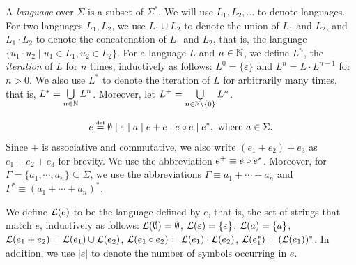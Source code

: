 A \emph{language} over $\Sigma$ is a subset of $\Sigma^*$. We will use $L_1, L_2, \dots$ to denote languages. For two languages $L_1, L_2$, we use $L_1 \cup L_2$ to denote the union of $L_1$ and $L_2$, and $L_1 \cdot L_2$ to denote the concatenation of $L_1$ and $L_2$, that is, the language $\{u_1 \cdot u_2 \mid u_1 \in L_1, u_2 \in L_2\}$. For a language $L$ and $n \in \mathbb{N}$, we define $L^n$, the \emph{iteration} of $L$ for $n$ times, inductively as follows: $L^0=\{\varepsilon\}$ and $L^{n} =L \cdot L^{n-1}$ for $n > 0$. We also use $L^*$ to denote the iteration of $L$ for arbitrarily many times, that is, $L^* = \bigcup \limits_{n \in \mathbb{N}} L^n$. Moreover, let $L^+ = \bigcup \limits_{n \in \mathbb{N} \setminus \{0\}} L^n$.

\begin{definition}
	\[e \eqdef \emptyset \mid \varepsilon \mid a \mid e + e \mid e \concat e \mid e^*, \mbox{ where } a \in \Sigma. \]
	Since $+$ is associative and commutative, we also write $(e_1 + e_2) + e_3$ as $e_1 + e_2 + e_3$ for brevity. We use the abbreviation $e^+ \equiv e \circ e^*$. Moreover, for $\Gamma = \{a_1, \cdots, a_n\}\subseteq \Sigma$, we use the abbreviations $\Gamma \equiv a_1 + \cdots + a_n$ and $\Gamma^\ast \equiv (a_1 + \cdots + a_n)^\ast$. 
\end{definition}
We define $\mathcal{L}(e)$ to be the language defined by $e$, that is, the set of strings that match $e$, inductively as follows: $\mathcal{L}(\emptyset) =\emptyset$,
$\mathcal{L}(\varepsilon) =\{\varepsilon\}$,
%
$\mathcal{L}(a)= \{a\}$,
%
$\mathcal{L}(e_1 + e_2) = \mathcal{L}(e_1) \cup \mathcal{L}(e_2)$,
%
$\mathcal{L}(e_1 \circ e_2) = \mathcal{L}(e_1) \cdot \mathcal{L}(e_2)$,
%
$\mathcal{L}(e_1^*)=(\mathcal{L}(e_1))^*$.
In addition, we use $|e|$ to denote the number of symbols occurring in $e$.

